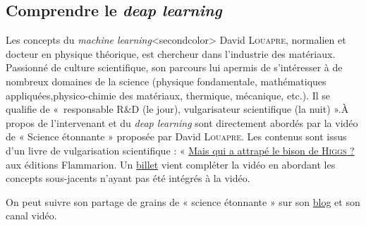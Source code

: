 \subsection[Comprendre le \textit{deap learning}]{Comprendre le \textit{deap learning}}
\label{sub:III.4.1}

Les concepts du \textit{machine learning}\caution[t]<secondcolor>{%
David \textsc{Louapre}, normalien et docteur en physique théorique, est chercheur dans l'industrie des matériaux. Passionné de culture scientifique, son parcours lui a\linebreak permis de s’intéresser à de nombreux domaines de la science (physique fondamentale, mathématiques appliquées,\linebreak physico-chimie des matériaux, thermi\-que, mécanique, etc.). Il se qualifie de «~responsable R{\&}D (le jour), vulgarisateur scientifique (la nuit) ».}{À propos de l'intervenant}
 et du \textit{deap learning} sont directement abordés par la vidéo de « Science étonnante » proposée par David \textsc{Louapre}. Les contenus sont issus d'un livre de vulgarisation scientifique : « \href{https://editions.flammarion.com/Catalogue/hors-collection/sciences/mais-qui-a-attrape-le-bison-de-higgs}{Mais qui a attrapé le bison de \textsc{Higgs} ?} aux éditions Flammarion. Un \href{https://scienceetonnante.com/2016/04/08/le-deep-learning/}{billet} vient compléter la vidéo en abordant les concepts sous-jacents n'ayant pas été intégrés à la vidéo.

On peut suivre son partage de grains de « science étonnante » sur son \href{https://scienceetonnante.com/}{blog} et son canal vidéo.

